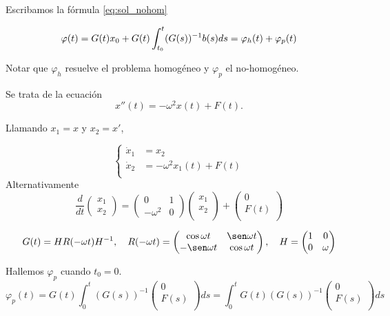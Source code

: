 Escribamos la fórmula \eqref{eq:sol_nohom} 

\[
\varphi(t) =G(t) x_{0}+G(t) \int_{t_{0}}^{t}(G(s))^{-1} b(s) d s \\
=\varphi_{h}(t)+\varphi_{p}(t)
\]

Notar que $\varphi_h$ resuelve el problema homogéneo y $\varphi_p$ el no-homogéneo.


\begin{ejemplo}{} Se trata de la ecuación
\[
 x''(t)=-\omega^2x(t)+F(t).
\]

Llamando $x_1=x$ y $x_2=x'$, 


\[
 \left\{
\begin{split}
\dot{x}_{1}&=x_{2} \\
\dot{x}_{2}&=-{\omega}^2x_{1}(t)+F(t) \\
\end{split}
\right.
\]
Alternativamente
\[
\frac{d}{dt}
    \begin{pmatrix}
    x_{1} \\
    x_{2}
    \end{pmatrix} =
    \begin{pmatrix}
    0 & 1 \\
    -\omega^{2} & 0
    \end{pmatrix}
    \begin{pmatrix}
    x_{1} \\
    x_{2}\\
    \end{pmatrix}+
    \begin{pmatrix}
    0 \\
    F(t)\\
    \end{pmatrix}
\]

 \[G(t)=H R(-\omega t) H^{-1},\quad
 R(-\omega t)=
 \begin{pmatrix}
\cos \omega t & \sen \omega t \\
-\sen \omega t & \cos \omega t
\end{pmatrix},\quad
H=
 \begin{pmatrix}
1 & 0 \\
0 & \omega
\end{pmatrix}
\]

Hallemos $\varphi_{p}$ cuando $t_{0}=0$.
\[
\varphi_{p}(t)=G(t) \int_{0}^{t}(G(s))^{-1}
                \begin{pmatrix}
                    0 \\
                    F(s)\\
                \end{pmatrix}
              d s
            =\int_{0}^{t} G(t)(G(s))^{-1}                \begin{pmatrix}
                    0 \\
                    F(s)\\
                \end{pmatrix} d s 
\]


\end{ejemplo}
